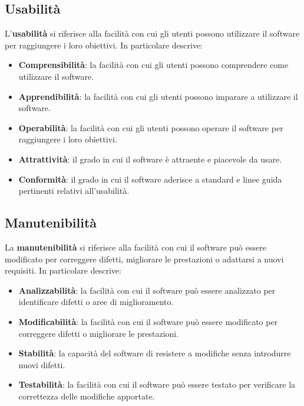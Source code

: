 \documentclass[a4paper, 11pt]{article}
\begin{document}
\subsection{Usabilità}
L'\textbf{usabilità} si riferisce alla facilità con cui gli utenti possono utilizzare il software per raggiungere i loro obiettivi.
In particolare descrive:
\begin{itemize}
    \item \textbf{Comprensibilità}: la facilità con cui gli utenti possono comprendere come utilizzare il software.
    \item \textbf{Apprendibilità}: la facilità con cui gli utenti possono imparare a utilizzare il software.
    \item \textbf{Operabilità}: la facilità con cui gli utenti possono operare il software per raggiungere i loro obiettivi.
    \item \textbf{Attrattività}: il grado in cui il software è attraente e piacevole da usare.
    \item \textbf{Conformità}: il grado in cui il software aderisce a standard e linee guida pertinenti relativi all'usabilità.
\end{itemize}
\subsection{Manutenibilità}
La \textbf{manutenibilità} si riferisce alla facilità con cui il software può essere modificato per correggere difetti, migliorare le prestazioni o adattarsi a nuovi requisiti.
In particolare descrive:
\begin{itemize}
    \item \textbf{Analizzabilità}: la facilità con cui il software può essere analizzato per identificare difetti o aree di miglioramento.
    \item \textbf{Modificabilità}: la facilità con cui il software può essere modificato per correggere difetti o migliorare le prestazioni.
    \item \textbf{Stabilità}: la capacità del software di resistere a modifiche senza introdurre nuovi difetti.
    \item \textbf{Testabilità}: la facilità con cui il software può essere testato per verificare la correttezza delle modifiche apportate.
\end{itemize}
\end{document}

